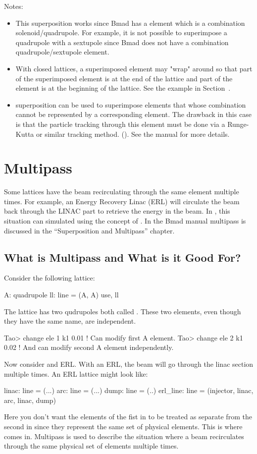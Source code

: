 \documentclass{hitec}
\newcommand{\Section}[1]{\section{#1}\vspace*{-1ex}}
\begin{document}
Notes:
\vspace{-10 pt}
\begin{itemize}
\item 
This superposition works since Bmad has a  element which is a combination
solenoid/quadrupole. For example, it is not possible to superimpose a quadrupole with a sextupole
since Bmad does not have a combination quadrupole/sextupole element.
\item 
With closed lattices, a superimposed element may "wrap" around so that part of
the superimposed element is at the end of the lattice and part of the element is at the beginning of
the lattice. See the example in Section~.
\item
{} superposition can be used to superimpose elements that whose combination cannot be
represented by a corresponding \bmad element. The drawback in this case is that the particle
tracking through this element must be done via a Runge-Kutta or similar tracking
method. (). See the \bmad manual for more details.
\end{itemize}

\newpage

\Section{Multipass}
\label{s:multipass}

Some lattices have the beam recirculating through the same element multiple times. For example, an
Energy Recovery Linac (ERL) will circulate the beam back through the LINAC part to retrieve the
energy in the beam. In \bmad, this situation can simulated using the concept of . 
In the Bmad manual multipass is discussed in the ``Superposition and Multipass'' chapter.

\subsection{What is Multipass and What is it Good For?}

Consider the following lattice:
\begin{code}
A: quadrupole
ll: line = (A, A)
use, ll
\end{code}
The lattice has two qudrupoles both called . These two elements, even though they have the
same name, are independent.
\begin{code}
Tao> change ele 1 k1 0.01   ! Can modify first A element.
Tao> change ele 2 k1 0.02   ! And can modify second A element independently.
\end{code}
Now consider and ERL. With an ERL, the beam will go through the linac section multiple times. An ERL
lattice might look like:
\begin{code}
linac: line = (...)
arc: line = (...)
dump: line = (..)
erl_line: line = (injector, linac, arc, linac, dump)
\end{code}
Here you don't want the elements of the fist  in  to be treated as separate
from the second  in  since they represent the same set of physical elements.
This is where  comes in.  Multipass is used to describe the situation where a beam
recirculates through the same physical set of elements multiple times.
\end{document}

